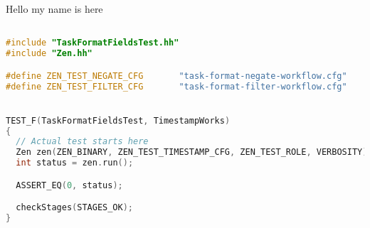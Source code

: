 

Hello my name is here \cite{ConcreteMath}


\begin{lstlisting}[language=C++]

#include "TaskFormatFieldsTest.hh"
#include "Zen.hh"

#define ZEN_TEST_NEGATE_CFG       "task-format-negate-workflow.cfg"
#define ZEN_TEST_FILTER_CFG       "task-format-filter-workflow.cfg"


TEST_F(TaskFormatFieldsTest, TimestampWorks)
{
  // Actual test starts here
  Zen zen(ZEN_BINARY, ZEN_TEST_TIMESTAMP_CFG, ZEN_TEST_ROLE, VERBOSITY);
  int status = zen.run();

  ASSERT_EQ(0, status);

  checkStages(STAGES_OK);
}
\end{lstlisting}
